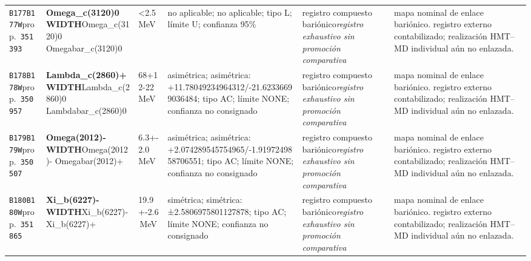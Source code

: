 \begin{landscape}
\begin{longtable}{L{1.85cm}L{4.45cm}L{2.35cm}L{4.05cm}L{3.35cm}L{7.15cm}}
\texttt{B177}\newline \texttt{B177W}\newline prop.\ \texttt{351393} & \textbf{Omega\_\allowbreak{}c(3120)0 WIDTH}\newline Omega\_\allowbreak{}c(3120)0 \textbar{}\allowbreak{} Omegabar\_\allowbreak{}c(3120)0 & \textless{}2.5\,MeV & no aplicable; no aplicable; tipo L; límite U; confianza 95\% & registro compuesto bariónico\newline \emph{registro exhaustivo sin promoción comparativa} & mapa nominal de enlace bariónico. registro externo contabilizado; realización HMT--MD individual aún no enlazada. \\
\texttt{B178}\newline \texttt{B178W}\newline prop.\ \texttt{350957} & \textbf{Lambda\_\allowbreak{}c(2860)+ WIDTH}\newline Lambda\_\allowbreak{}c(2860)0 \textbar{}\allowbreak{} Lambdabar\_\allowbreak{}c(2860)0 & 68+12-22\,MeV & asimétrica; asimétrica: +11.78049234964312/-21.62336699036484; tipo AC; límite NONE; confianza no consignado & registro compuesto bariónico\newline \emph{registro exhaustivo sin promoción comparativa} & mapa nominal de enlace bariónico. registro externo contabilizado; realización HMT--MD individual aún no enlazada. \\
\texttt{B179}\newline \texttt{B179W}\newline prop.\ \texttt{350507} & \textbf{Omega(2012)- WIDTH}\newline Omega(2012)- \textbar{}\allowbreak{} Omegabar(2012)+ & 6.3+-2.0\,MeV & asimétrica; asimétrica: +2.074289545754965/-1.9197249858706551; tipo AC; límite NONE; confianza no consignado & registro compuesto bariónico\newline \emph{registro exhaustivo sin promoción comparativa} & mapa nominal de enlace bariónico. registro externo contabilizado; realización HMT--MD individual aún no enlazada. \\
\texttt{B180}\newline \texttt{B180W}\newline prop.\ \texttt{351865} & \textbf{Xi\_\allowbreak{}b(6227)- WIDTH}\newline Xi\_\allowbreak{}b(6227)- \textbar{}\allowbreak{} Xi\_\allowbreak{}b(6227)+ & 19.9+-2.6\,MeV & simétrica; simétrica: ±2.5806975801127878; tipo AC; límite NONE; confianza no consignado & registro compuesto bariónico\newline \emph{registro exhaustivo sin promoción comparativa} & mapa nominal de enlace bariónico. registro externo contabilizado; realización HMT--MD individual aún no enlazada. \\

\end{longtable}
\end{landscape}
